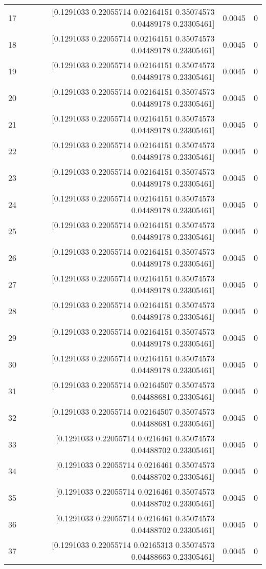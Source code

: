 \begin{longtable}{lrrr}
17 & [0.1291033  0.22055714 0.02164151 0.35074573 0.04489178 0.23305461] & 0.0045 & 0 \\
18 & [0.1291033  0.22055714 0.02164151 0.35074573 0.04489178 0.23305461] & 0.0045 & 0 \\
19 & [0.1291033  0.22055714 0.02164151 0.35074573 0.04489178 0.23305461] & 0.0045 & 0 \\
20 & [0.1291033  0.22055714 0.02164151 0.35074573 0.04489178 0.23305461] & 0.0045 & 0 \\
21 & [0.1291033  0.22055714 0.02164151 0.35074573 0.04489178 0.23305461] & 0.0045 & 0 \\
22 & [0.1291033  0.22055714 0.02164151 0.35074573 0.04489178 0.23305461] & 0.0045 & 0 \\
23 & [0.1291033  0.22055714 0.02164151 0.35074573 0.04489178 0.23305461] & 0.0045 & 0 \\
24 & [0.1291033  0.22055714 0.02164151 0.35074573 0.04489178 0.23305461] & 0.0045 & 0 \\
25 & [0.1291033  0.22055714 0.02164151 0.35074573 0.04489178 0.23305461] & 0.0045 & 0 \\
26 & [0.1291033  0.22055714 0.02164151 0.35074573 0.04489178 0.23305461] & 0.0045 & 0 \\
27 & [0.1291033  0.22055714 0.02164151 0.35074573 0.04489178 0.23305461] & 0.0045 & 0 \\
28 & [0.1291033  0.22055714 0.02164151 0.35074573 0.04489178 0.23305461] & 0.0045 & 0 \\
29 & [0.1291033  0.22055714 0.02164151 0.35074573 0.04489178 0.23305461] & 0.0045 & 0 \\
30 & [0.1291033  0.22055714 0.02164151 0.35074573 0.04489178 0.23305461] & 0.0045 & 0 \\
31 & [0.1291033  0.22055714 0.02164507 0.35074573 0.04488681 0.23305461] & 0.0045 & 0 \\
32 & [0.1291033  0.22055714 0.02164507 0.35074573 0.04488681 0.23305461] & 0.0045 & 0 \\
33 & [0.1291033  0.22055714 0.0216461  0.35074573 0.04488702 0.23305461] & 0.0045 & 0 \\
34 & [0.1291033  0.22055714 0.0216461  0.35074573 0.04488702 0.23305461] & 0.0045 & 0 \\
35 & [0.1291033  0.22055714 0.0216461  0.35074573 0.04488702 0.23305461] & 0.0045 & 0 \\
36 & [0.1291033  0.22055714 0.0216461  0.35074573 0.04488702 0.23305461] & 0.0045 & 0 \\
37 & [0.1291033  0.22055714 0.02165313 0.35074573 0.04488663 0.23305461] & 0.0045 & 0 \\

\end{longtable}
